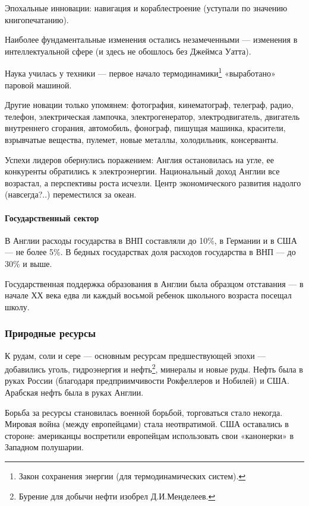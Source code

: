 Эпохальные инновации: навигация и кораблестроение (уступали по значению книгопечатанию).


Наиболее фундаментальные изменения остались незамеченными — изменения в интеллектуальной сфере (и здесь не обошлось без
Джеймса Уатта).


Наука училась у техники — первое начало термодинамики\footnote{Закон сохранения энергии (для
термодинамических систем).} «выработано» паровой машиной.


Другие новации только упомянем: фотография, кинематограф, телеграф, радио, телефон, электрическая лампочка,
электрогенератор, электродвигатель, двигатель внутреннего сгорания, автомобиль, фонограф, пишущая машинка, красители,
взрывчатые вещества, пулемет, новые металлы, холодильник, консерванты.


Успехи лидеров обернулись поражением: Англия остановилась на угле, ее конкуренты обратились к электроэнергии.
Национальный доход Англии все возрастал, а перспективы роста исчезли. Центр экономического развития надолго
(навсегда?..) переместился за океан.

\paragraph[Государственный сектор]{Государственный сектор}

В Англии расходы государства в ВНП составляли до 10\%, в Германии и в США — не более 5\%. В бедных государствах доля
расходов государства в ВНП — до 30\% и выше.


Государственная поддержка образования в Англии была образцом отставания — в начале ХХ века едва ли каждый восьмой
ребенок школьного возраста посещал школу.

\subsubsection[Природные ресурсы]{Природные ресурсы}

К рудам, соли и сере — основным ресурсам предшествующей эпохи — добавились уголь, гидроэнергия и
нефть\footnote{Бурение для добычи нефти изобрел Д.И.Менделеев.}, минералы и новые руды. Нефть была в
руках России (благодаря предприимчивости Рокфеллеров и Нобилей) и США. Арабская нефть была в руках Англии.


Борьба за ресурсы становилась военной борьбой, торговаться стало некогда. Мировая война (между европейцами) стала
неотвратимой. США оставались в стороне: американцы воспретили европейцам использовать свои «канонерки» в Западном
полушарии.


